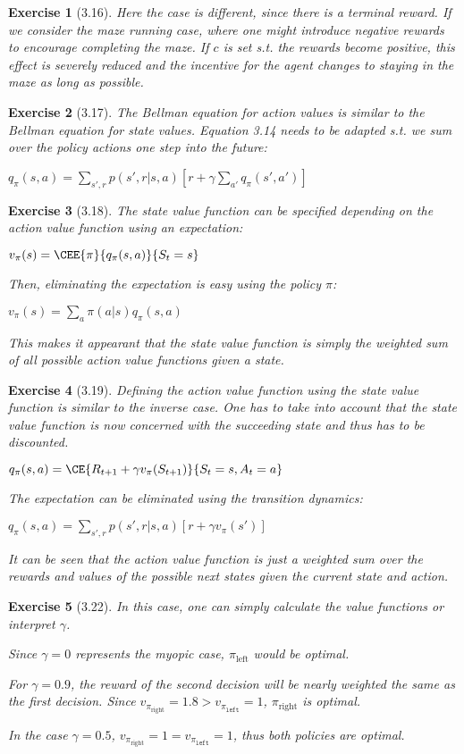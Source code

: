 \documentclass[a4paper]{scrartcl}
\theoremstyle{nonumberplain}
\newtheorem{ex}{Exercise}
\begin{document}
\begin{ex}[3.16]
Here the case is different, since there is a terminal reward. If we consider the maze running case, where one might introduce negative rewards to encourage completing the maze. If $c$ is set s.t. the rewards become positive, this effect is severely reduced and the incentive for the agent changes to staying in the maze as long as possible.
\end{ex}

\begin{ex}[3.17]
The Bellman equation for action values is similar to the Bellman equation for state values. Equation 3.14 needs to be adapted s.t. we sum over the policy actions one step into the future:

$q_\pi(s,a)=\sum_{s',r} p(s',r|s,a) [r + \gamma \sum_{a'} q_\pi(s',a')]$
\end{ex}

\begin{ex}[3.18]
The state value function can be specified depending on the action value function using an expectation:

$v_\pi(s)=\CEE{\pi}{q_\pi(s,a)}{S_t=s}$

Then, eliminating the expectation is easy using the policy $\pi$:

$v_\pi(s)=\sum_a \pi(a|s)q_\pi(s,a)$

This makes it appearant that the state value function is simply the weighted sum of all possible action value functions given a state.
\end{ex}

\begin{ex}[3.19]
Defining the action value function using the state value function is similar to the inverse case. One has to take into account that the state value function is now concerned with the succeeding state and thus has to be discounted.

$q_\pi(s,a)=\CE{R_{t+1} + \gamma v_\pi(S_{t+1})}{S_t=s,A_t=a}$

The expectation can be eliminated using the transition dynamics:

$q_\pi(s,a)=\sum_{s',r} p(s',r|s,a) [r + \gamma v_\pi(s')]$

It can be seen that the action value function is just a weighted sum over the rewards and values of the possible next states given the current state and action.
\end{ex}

\begin{ex}[3.22]

In this case, one can simply calculate the value functions or interpret $\gamma$.

Since $\gamma=0$ represents the myopic case, $\pi_\text{left}$ would be optimal.

For $\gamma=0.9$, the reward of the second decision will be nearly weighted the same as the first decision. Since $v_{\pi_\text{right}}=1.8 > v_{\pi_\texttt{left}}=1$, $\pi_\text{right}$ is optimal.

In the case $\gamma=0.5$, $v_{\pi_\text{right}}=1 = v_{\pi_\texttt{left}}=1$, thus both policies are optimal.
\end{ex}
\end{document}

